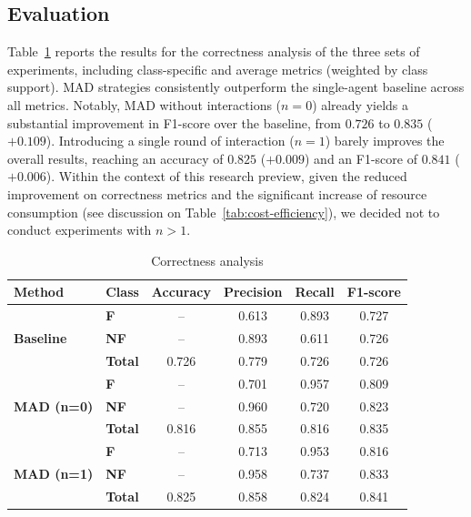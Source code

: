 \documentclass[conference]{IEEEtran}
\begin{document}
\subsection{Evaluation}

Table~\ref{tab:results} reports the results for the correctness analysis of the three sets of experiments, including class-specific and average metrics (weighted by class support). MAD strategies consistently outperform the single-agent baseline across all metrics. Notably, MAD without interactions ($n=0$) already yields a substantial improvement in F1-score over the baseline, from $0.726$ to $0.835$ ($+0.109$). Introducing a single round of interaction ($n=1$) barely improves the overall results, reaching an accuracy of $0.825$ ($+0.009$) and an F1-score of $0.841$ ($+0.006$). Within the context of this research preview, given the reduced improvement on correctness metrics and the significant increase of resource consumption (see discussion on Table~\ref{tab:cost-efficiency}), we decided not to conduct experiments with $n>1$.

\begin{table}[h]
\caption{Correctness analysis}
\label{tab:results}
\begin{tabularx}{\linewidth}{@{}lXcccc@{}}
\toprule
\textbf{Method} & \textbf{Class} & \textbf{Accuracy} & \textbf{Precision} & \textbf{Recall} & \textbf{F1-score} \\ \midrule
\multirow{3}{*}{\textbf{Baseline}}  & \textbf{F}     & --     & 0.613 & 0.893 & 0.727 \\
                                    & \textbf{NF}    & --     & 0.893 & 0.611 & 0.726 \\
                                    & \textbf{Total} & 0.726  & 0.779 & 0.726 & 0.726 \\ \midrule
\multirow{3}{*}{\textbf{MAD (n=0)}} & \textbf{F}     & --     & 0.701 & 0.957 & 0.809 \\
                                    & \textbf{NF}    & --     & 0.960 & 0.720 & 0.823 \\
                                    & \textbf{Total} & 0.816  & 0.855 & 0.816 & 0.835 \\ \midrule
\multirow{3}{*}{\textbf{MAD (n=1)}} & \textbf{F}     & --     & 0.713 & 0.953 & 0.816 \\
                                    & \textbf{NF}    & --     & 0.958 & 0.737 & 0.833 \\
                                    & \textbf{Total} & 0.825  & 0.858 & 0.824 & 0.841 \\ \bottomrule
\end{tabularx}
\end{table}
\end{document}
